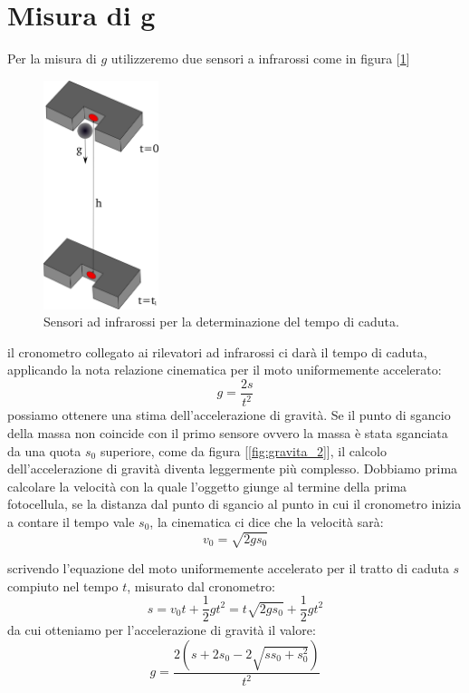 \documentclass[a4paper,10pt,oneside]{article}
\begin{document}
\section*{Misura di g}


Per la misura di $g$ utilizzeremo due sensori a infrarossi come in figura [\ref{fig:gravita_1}]
\begin{figure}[H]
 \centering
 \includegraphics[width=0.3\textwidth]{./Immagini/gravita.png}
 \caption{Sensori ad infrarossi per la determinazione del tempo di caduta.}
 \label{fig:gravita_1}
\end{figure}
il cronometro collegato ai rilevatori ad infrarossi ci darà il tempo di caduta, applicando la nota relazione cinematica per il moto uniformemente accelerato:
\begin{equation}
 g=\frac{2s}{t^2}
\end{equation}
possiamo ottenere una stima dell'accelerazione di gravità.
Se il punto di sgancio della massa non coincide con il primo sensore ovvero la massa è stata sganciata da una quota $s_0$ superiore, come da figura [\ref{fig:gravita_2}], il calcolo dell'accelerazione di gravità diventa leggermente più complesso. Dobbiamo prima calcolare la velocità con la quale l'oggetto giunge al termine della prima fotocellula, se la distanza dal punto di sgancio al punto in cui il cronometro inizia a contare il tempo vale $s_0$, la cinematica ci dice che la velocità sarà:
\begin{equation}\label{g_semplice}
 v_0=\sqrt{2gs_0}
\end{equation}

scrivendo l'equazione del moto uniformemente accelerato per il tratto di caduta $s$ compiuto nel tempo $t$, misurato dal cronometro:
\begin{equation}
s=v_0t+\frac 1 2 gt^2=t\sqrt{2gs_0}+\frac{1}{2}gt^2
\end{equation}
da cui otteniamo per l'accelerazione di gravità il valore:
\begin{equation}\label{g_completo}
g=\frac{2(s+2s_0-2\sqrt{ss_0+s_0^2})}{t^2}
\end{equation}
\end{document}
